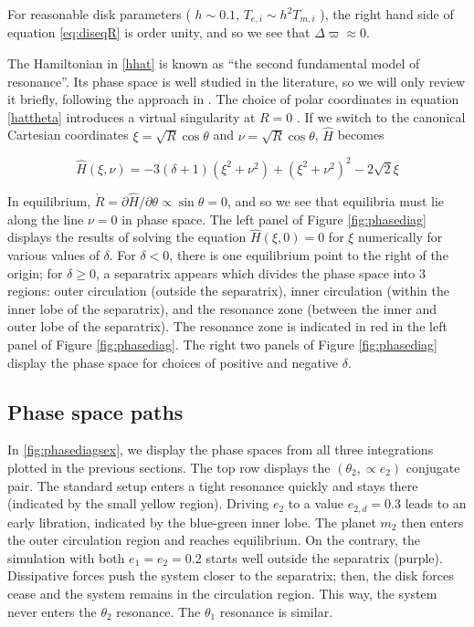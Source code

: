 \documentclass{mnras}
\renewcommand{\d}{\partial}
\begin{document}
For reasonable disk parameters ( \(h\sim 0.1\), \(T_{e,i}\sim h^2
T_{m,i}\) ), the right hand side of equation \eqref{eq:diseqR}
is order unity, and so we see that \(\Delta\varpi\approx 0\).


The Hamiltonian in \eqref{hhat} is known as ``the second fundamental
model of resonance''. Its phase space is well studied in the
literature, so we will only review it briefly, following the approach
in \cite{henrard_second_1983}.  The choice of polar coordinates in
equation \eqref{hattheta} introduces a virtual singularity at \(R=0\)
\cite{henrard_second_1983}.  If we switch to the canonical Cartesian
coordinates \(\xi = \sqrt{R}\cos\theta\) and \(\nu = \sqrt{R}\cos\theta\),
\(\hat H\) becomes

\begin{equation}
  \hat H(\xi,\nu) = -3(\delta+1)(\xi^2+\nu^2) + (\xi^2+\nu^2)^2 -2\sqrt2
  \xi
\end{equation}

In equilibrium, \(\dot R = \d\hat H/\d\theta \propto \sin\theta= 0\),
and so we see that equilibria must lie along the line \(\nu=0\) in phase
space.  The left panel of Figure \ref{fig:phasediag} displays the
results of solving the equation \(\hat H(\xi, 0) = 0\) for \(\xi\)
numerically for various values of \(\delta\).  For \(\delta<0\), there is
one equilibrium point to the right of the origin; for \(\delta \geq 0\),
a separatrix appears which divides the phase space into 3 regions:
outer circulation (outside the separatrix), inner circulation (within
the inner lobe of the separatrix), and the resonance zone (between the
inner and outer lobe of the separatrix).  The resonance zone is
indicated in red in the left panel of Figure \ref{fig:phasediag}.  The
right two panels of Figure \ref{fig:phasediag} display the phase space
for choices of positive and negative \(\delta\).

\subsection{Phase space paths}
\label{sec:org7013bae}
\begin{figure*}
  \centering
  \texttt{[image: \{./relative-geometry]}.png}
  \caption{ }
  \label{fig:relgeom}
\end{figure*}
In \ref{fig:phasediagsex}, we display the phase spaces from all three
integrations plotted in the previous sections.
The top row displays the \((\theta_2, \propto e_2)\) conjugate pair.
The standard setup enters a tight resonance quickly and stays there (indicated by the small yellow region).
Driving \(e_2\) to a value \(e_{2,d}=0.3\) leads to an early libration, indicated by the blue-green inner lobe.
The planet \(m_2\) then enters the outer circulation region and reaches equilibrium.
On the contrary, the simulation with both \(e_1 = e_2 = 0.2\) starts well outside the separatrix (purple).
Dissipative forces push the system closer to the separatrix; then, the disk forces cease
and the system remains in the circulation region. This way, the system never enters the \(\theta_2\)
resonance. The \(\theta_1\) resonance is similar.
\end{document}
